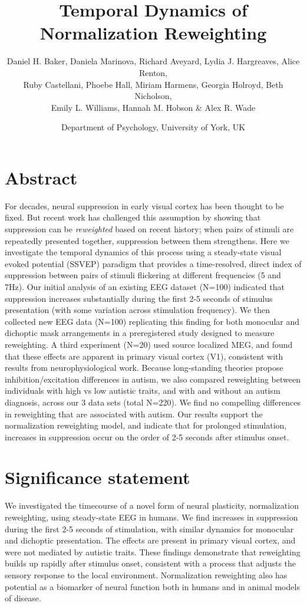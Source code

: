\documentclass[
]{article}
\title{Temporal Dynamics of Normalization Reweighting}
\author{Daniel H. Baker, Daniela Marinova, Richard Aveyard, Lydia J. Hargreaves, Alice Renton,\\
Ruby Castellani, Phoebe Hall, Miriam Harmens, Georgia Holroyd, Beth Nicholson,\\
Emily L. Williams, Hannah M. Hobson \& Alex R. Wade}
\date{Department of Psychology, University of York, UK}
\begin{document}
\maketitle

\hypertarget{abstract}{%
\section{Abstract}\label{abstract}}

For decades, neural suppression in early visual cortex has been thought to be fixed. But recent work has challenged this assumption by showing that suppression can be \emph{reweighted} based on recent history; when pairs of stimuli are repeatedly presented together, suppression between them strengthens. Here we investigate the temporal dynamics of this process using a steady-state visual evoked potential (SSVEP) paradigm that provides a time-resolved, direct index of suppression between pairs of stimuli flickering at different frequencies (5 and 7Hz). Our initial analysis of an existing EEG dataset (N=100) indicated that suppression increases substantially during the first 2-5 seconds of stimulus presentation (with some variation across stimulation frequency). We then collected new EEG data (N=100) replicating this finding for both monocular and dichoptic mask arrangements in a preregistered study designed to measure reweighting. A third experiment (N=20) used source localized MEG, and found that these effects are apparent in primary visual cortex (V1), consistent with results from neurophysiological work. Because long-standing theories propose inhibition/excitation differences in autism, we also compared reweighting between individuals with high vs low autistic traits, and with and without an autism diagnosis, across our 3 data sets (total N=220). We find no compelling differences in reweighting that are associated with autism. Our results support the normalization reweighting model, and indicate that for prolonged stimulation, increases in suppression occur on the order of 2-5 seconds after stimulus onset.

\hypertarget{significance-statement}{%
\section{Significance statement}\label{significance-statement}}

We investigated the timecourse of a novel form of neural plasticity, normalization reweighting, using steady-state EEG in humans. We find increases in suppression during the first 2-5 seconds of stimulation, with similar dynamics for monocular and dichoptic presentation. The effects are present in primary visual cortex, and were not mediated by autistic traits. These findings demonstrate that reweighting builds up rapidly after stimulus onset, consistent with a process that adjusts the sensory response to the local environment. Normalization reweighting also has potential as a biomarker of neural function both in humans and in animal models of disease.
\end{document}
